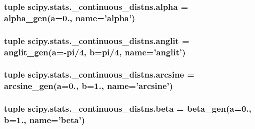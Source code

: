 \subsubsection[{alpha}]{\setlength{\rightskip}{0pt plus 5cm}tuple scipy.\+stats.\+\_\+continuous\+\_\+distns.\+alpha = {\bf alpha\+\_\+gen}({\bf a}=0., name='alpha')}\label{namespacescipy_1_1stats_1_1__continuous__distns_a7f01ce8f4f0a8f0106591aa4ff8dd4ba}
\hypertarget{namespacescipy_1_1stats_1_1__continuous__distns_afd8d30b213ef7128dbe042ac333feb94}{}
\subsubsection[{anglit}]{\setlength{\rightskip}{0pt plus 5cm}tuple scipy.\+stats.\+\_\+continuous\+\_\+distns.\+anglit = {\bf anglit\+\_\+gen}({\bf a}=-\/pi/4, {\bf b}=pi/4, name='anglit')}\label{namespacescipy_1_1stats_1_1__continuous__distns_afd8d30b213ef7128dbe042ac333feb94}
\hypertarget{namespacescipy_1_1stats_1_1__continuous__distns_a0f784ba3ff0764af1c147323238ff4c0}{}
\subsubsection[{arcsine}]{\setlength{\rightskip}{0pt plus 5cm}tuple scipy.\+stats.\+\_\+continuous\+\_\+distns.\+arcsine = {\bf arcsine\+\_\+gen}({\bf a}=0., {\bf b}=1., name='arcsine')}\label{namespacescipy_1_1stats_1_1__continuous__distns_a0f784ba3ff0764af1c147323238ff4c0}
\hypertarget{namespacescipy_1_1stats_1_1__continuous__distns_aed1990448a10b21d9c9fcc155f0d8562}{}
\subsubsection[{beta}]{\setlength{\rightskip}{0pt plus 5cm}tuple scipy.\+stats.\+\_\+continuous\+\_\+distns.\+beta = {\bf beta\+\_\+gen}({\bf a}=0., {\bf b}=1., name='beta')}\label{namespacescipy_1_1stats_1_1__continuous__distns_aed1990448a10b21d9c9fcc155f0d8562}
\hypertarget{namespacescipy_1_1stats_1_1__continuous__distns_a4189f178cec3858fe5598b02e9e37331}{}
